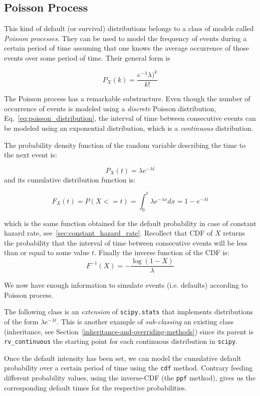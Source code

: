 \subsection{Poisson Process}
\label{sec:poisson_process}
This kind of default (or survival) distributions belongs to a class of models called \emph{Poisson processes}. 
They can be used to model the frequency of events during a certain period of time assuming that one knows the average occurrence of those events over some period of time. 
Their general form is

\begin{equation}
P_X(k) = \frac{e^{-\lambda} \lambda)^{k}}{k!}
\label{eq:poisson_distribution}
\end{equation}

The Poisson process has a remarkable substructure. Even though the number of occurrence of events is modeled using a \emph{discrete} Poisson distribution, Eq.~\ref{eq:poisson_distribution}, the interval of time between consecutive events can be modeled using an exponential distribution, which is a \emph{continuous} distribution.

The probability density function of the random variable describing the time to the next event is:

\begin{equation}
P_X(t) = \lambda e^{-\lambda t}
\label{eq:inter-arrival}
\end{equation}
and its cumulative distribution function is:

\begin{equation}
F_X(t) = P(X<=t) = \int_{0}^{t}\lambda e^{-\lambda x} dx = 1 - e^{-\lambda t}
\label{eq:inter-arrival}
\end{equation}

which is the same function obtained for the default probability in case of constant hazard rate, see~\ref{sec:constant_hazard_rate}.
Recollect that CDF of $X$ returns the probability that the interval of time between consecutive events will be less than or equal to some value $t$.
Finally the inverse function of the CDF is:
\begin{equation}
F^{-1}(X) = -\frac{\log(1-X)}{\lambda}
\end{equation}

\begin{finmarkets}
We now have enough information to simulate events (i.e. defaults) according to Poisson process. 

The following class is an \emph{extension} of \texttt{scipy.stats} that implements distributions of the form $\lambda e^{-\lambda t}$. This is another example of \emph{sub-classing} an existing class (inheritance, see Section~\ref{inheritance-and-overriding-methods}) since its parent is \texttt{rv\_continuous} the starting point for each continuous distribution in \texttt{scipy}.

Once the default intensity has been set, we can model the cumulative default probability over a certain period of time using the \texttt{cdf} method. Contrary feeding different probability values, using the inverse-CDF (the \texttt{ppf} method), gives us the corresponding default times for the respective probabilities.
\end{finmarkets}

